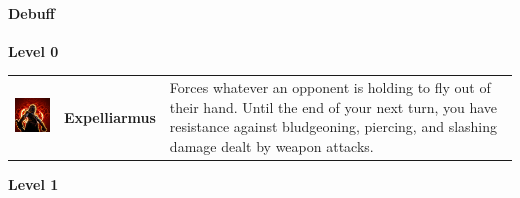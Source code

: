 \paragraph{Debuff} 
\textbf{Level 0 } 
\begin{tabular}{ m{4cm}m{3cm}m{6cm} } 
	\includegraphics[width=4cm]{../Pictures/Gameplay/Spells/Icon/spell_icon.png} & \textbf{Expelliarmus} &  Forces whatever an opponent is holding to fly out of their hand. Until the end of your next turn, you have resistance against bludgeoning, piercing, and slashing damage dealt by weapon attacks.  \\ 
\end{tabular}
\textbf{Level 1} 

